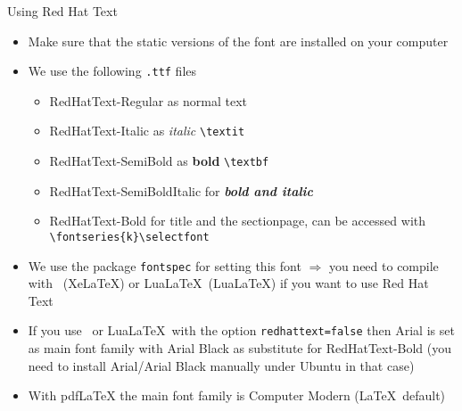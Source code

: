 \documentclass[aspectratio=169]{beamer}
\begin{document}
\begin{frame}{Using Red Hat Text}
	\label{remarks-font}
	\begin{itemize}
		\item Make sure that the static versions of the font are installed on your computer
		\item We use the following \texttt{.ttf} files \begin{itemize}
			\item RedHatText-Regular as normal text
			\item RedHatText-Italic as \textit{italic} \texttt{\textbackslash textit}
			\item RedHatText-SemiBold as \textbf{bold} \texttt{\textbackslash textbf}
			\item RedHatText-SemiBoldItalic for \textbf{\textit{bold and italic}}
			\item RedHatText-Bold for {\selectfont title and the sectionpage}, can be accessed with \texttt{\textbackslash fontseries\{k\}\textbackslash selectfont} 
		\end{itemize}
		\item We use the package \texttt{fontspec} for setting this font $\Rightarrow$ you need to compile with \XeLaTeX\ (XeLaTeX) or Lua\LaTeX\ (LuaLaTeX) if you want to use Red Hat Text
		\item If you use \XeLaTeX\ or Lua\LaTeX\ with the option \texttt{redhattext=false} then Arial is set as main font family with Arial Black as substitute for {\selectfont RedHatText-Bold} (you need to install Arial/Arial Black manually under Ubuntu in that case)
		\item With pdfLaTeX the main font family is Computer Modern (\LaTeX\ default)
	\end{itemize}
\end{frame}
\end{document}
